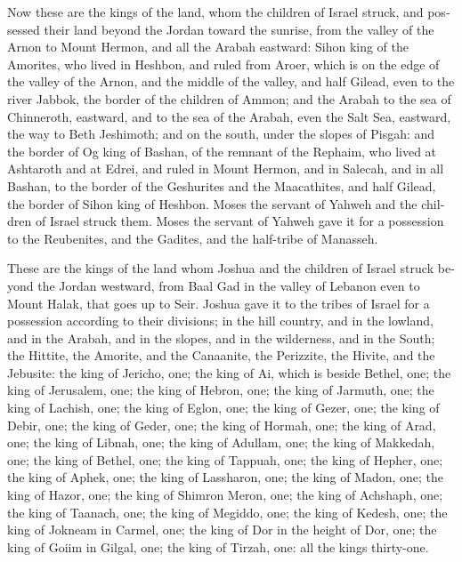 \begin{paracol}{2}
\begin{otherlanguage}{english}
 Now these are the kings of the land, whom the children of
Israel struck, and possessed their land beyond the Jordan toward the
sunrise, from the valley of the Arnon to Mount Hermon, and all the
Arabah eastward:  Sihon king of the Amorites, who lived in
Heshbon, and ruled from Aroer, which is on the edge of the valley of the
Arnon, and the middle of the valley, and half Gilead, even to the river
Jabbok, the border of the children of Ammon;  and the
Arabah to the sea of Chinneroth, eastward, and to the sea of the Arabah,
even the Salt Sea, eastward, the way to Beth Jeshimoth; and on the
south, under the slopes of Pisgah:  and the border of Og
king of Bashan, of the remnant of the Rephaim, who lived at Ashtaroth
and at Edrei,  and ruled in Mount Hermon, and in Salecah,
and in all Bashan, to the border of the Geshurites and the Maacathites,
and half Gilead, the border of Sihon king of Heshbon. 
Moses the servant of Yahweh and the children of Israel struck them.
Moses the servant of Yahweh gave it for a possession to the Reubenites,
and the Gadites, and the half-tribe of Manasseh.

 These are the kings of the land whom Joshua and the
children of Israel struck beyond the Jordan westward, from Baal Gad in
the valley of Lebanon even to Mount Halak, that goes up to Seir. Joshua
gave it to the tribes of Israel for a possession according to their
divisions;  in the hill country, and in the lowland, and
in the Arabah, and in the slopes, and in the wilderness, and in the
South; the Hittite, the Amorite, and the Canaanite, the Perizzite, the
Hivite, and the Jebusite:  the king of Jericho, one; the
king of Ai, which is beside Bethel, one;  the king of
Jerusalem, one; the king of Hebron, one;  the king of
Jarmuth, one; the king of Lachish, one;  the king of
Eglon, one; the king of Gezer, one;  the king of Debir,
one; the king of Geder, one;  the king of Hormah, one;
the king of Arad, one;  the king of Libnah, one; the king
of Adullam, one;  the king of Makkedah, one; the king of
Bethel, one;  the king of Tappuah, one; the king of
Hepher, one;  the king of Aphek, one; the king of
Lassharon, one;  the king of Madon, one; the king of
Hazor, one;  the king of Shimron Meron, one; the king of
Achshaph, one;  the king of Taanach, one; the king of
Megiddo, one;  the king of Kedesh, one; the king of
Jokneam in Carmel, one;  the king of Dor in the height of
Dor, one; the king of Goiim in Gilgal, one;  the king of
Tirzah, one: all the kings thirty-one.


\end{otherlanguage}
\end{paracol}
